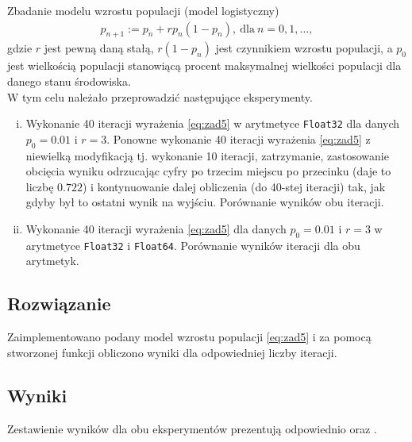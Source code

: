 \documentclass[11pt]{mk-polish-lab-report}
\begin{document}
Zbadanie modelu wzrostu populacji (model logistyczny)
\begin{align}
p_{n+1} := p_n + rp_n(1-p_n), \ \textrm{dla} \ n = 0, 1, \dots,
\label{eq:zad5}
\end{align}
gdzie $r$ jest pewną daną stałą, $r(1-p_n)$ jest czynnikiem wzrostu populacji, a $p_0$ jest wielkością populacji stanowiącą procent maksymalnej wielkości populacji dla danego stanu środowiska. \\
\newline
W tym celu należało przeprowadzić następujące eksperymenty.
\begin{enumerate}[(i)]
\item Wykonanie 40 iteracji wyrażenia \eqref{eq:zad5} w arytmetyce \texttt{Float32} dla danych $p_0 = 0.01$ i $r = 3$. Ponowne wykonanie 40 iteracji wyrażenia \eqref{eq:zad5} z niewielką modyfikacją tj. wykonanie 10 iteracji, zatrzymanie, zastosowanie obcięcia wyniku odrzucając cyfry po trzecim miejscu po przecinku (daje to liczbę $0.722$) i kontynuowanie dalej obliczenia (do 40-stej iteracji) tak, jak gdyby był to ostatni wynik na wyjściu. Porównanie wyników obu iteracji.
\item Wykonanie 40 iteracji wyrażenia \eqref{eq:zad5} dla danych $p_0 = 0.01$ i $r = 3$ w arytmetyce \texttt{Float32} i \texttt{Float64}. Porównanie wyników iteracji dla obu arytmetyk.
\end{enumerate}

\subsection{Rozwiązanie}

Zaimplementowano podany model wzrostu populacji \eqref{eq:zad5} i za pomocą stworzonej funkcji obliczono wyniki dla odpowiedniej liczby iteracji.

\subsection{Wyniki}

Zestawienie wyników dla obu eksperymentów prezentują odpowiednio  oraz .
\end{document}
